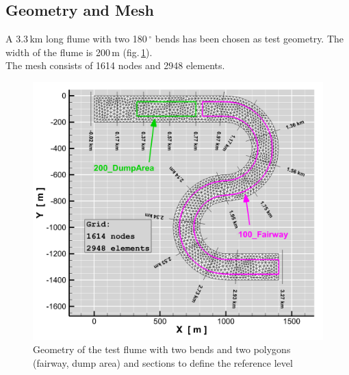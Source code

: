 \subsection{Geometry and Mesh}
A 3.3\,km long flume with two 180\,$^\circ$ bends has been chosen as test geometry.
The width of the flume is 200\,m (fig.\,\ref{E3grid}).\\
The mesh consists of 1614 nodes and 2948 elements.

\begin{figure} [!h]
\centering
\includegraphics[scale=0.14]{img/critDig_grid_Polys_2D.png}
\caption{Geometry of the test flume with two bends and two polygons (fairway, dump area) and sections to define the reference level}\label{E3grid}
\end{figure}

